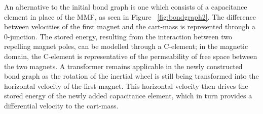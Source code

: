 \documentclass[notitlepage,10pt]{report}
\begin{document}
\begin{multicols}{2}
An alternative to the initial bond graph is one which consists of a capacitance element in place of the MMF, as seen in Figure ~\ref{fig:bondgraph2}. The difference between velocities of the first magnet and the cart-mass is represented through a 0-junction. The stored energy, resulting from the interaction between two repelling magnet poles, can be modelled through a C-element; in the magnetic domain, the C-element is representative of the permeability of free space between the two magnets. A transformer remains applicable in the newly constructed bond graph as the rotation of the inertial wheel is still being transformed into the horizontal velocity of the first magnet. This horizontal velocity then drives the stored energy of the newly added capacitance element, which in turn provides a differential velocity to the cart-mass.

\end{multicols}
\end{document}
